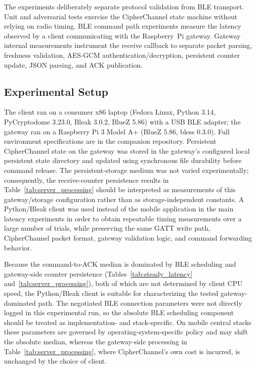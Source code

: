 \documentclass[journal]{IEEEtran}
\begin{document}
The experiments deliberately separate protocol validation from BLE transport. Unit and adversarial tests exercise the CipherChannel state machine without relying on radio timing. BLE command path experiments measure the latency observed by a client communicating with the Raspberry~Pi gateway. Gateway internal measurements instrument the receive callback to separate packet parsing, freshness validation, AES-GCM authentication/decryption, persistent counter update, JSON parsing, and ACK publication.

\subsection{Experimental Setup}

The client ran on a consumer x86 laptop (Fedora Linux, Python 3.14, PyCryptodome 3.23.0, Bleak 3.0.2, BlueZ 5.86) with a USB BLE adapter; the gateway ran on a Raspberry Pi 3 Model A+ (BlueZ 5.86, bless 0.3.0). Full environment specifications are in the companion repository. Persistent CipherChannel state on the gateway was stored in the gateway's configured local persistent state directory and updated using synchronous file durability before command release. The persistent-storage medium was not varied experimentally; consequently, the receive-counter persistence results in Table~\ref{tab:server_processing} should be interpreted as measurements of this gateway/storage configuration rather than as storage-independent constants. A Python/Bleak client was used instead of the mobile application in the main latency experiments in order to obtain repeatable timing measurements over a large number of trials, while preserving the same GATT write path, CipherChannel packet format, gateway validation logic, and command forwarding behavior.

Because the command-to-ACK median is dominated by BLE scheduling and gateway-side counter persistence (Tables~\ref{tab:steady_latency} and~\ref{tab:server_processing}), both of which are not determined by client CPU speed, the Python/Bleak client is suitable for characterizing the tested gateway-dominated path. The negotiated BLE connection parameters were not directly logged in this experimental run, so the absolute BLE scheduling component should be treated as implementation- and stack-specific. On mobile central stacks these parameters are governed by operating-system-specific policy and may shift the absolute median, whereas the gateway-side processing in Table~\ref{tab:server_processing}, where CipherChannel's own cost is incurred, is unchanged by the choice of client.
\end{document}

